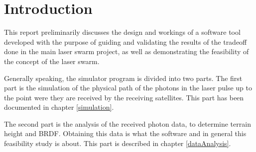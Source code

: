 \chapter{Introduction}
\label{intro}
This report preliminarily discusses the design and workings of a software tool developed with the purpose of guiding and validating the results of the tradeoff done in the main laser swarm project, as well as demonstrating the feasibility of the concept of the laser swarm.

Generally speaking, the simulator program is divided into two parts. The first part is the simulation of the physical path of the photons in the laser pulse up to the point were they are received by the receiving satellites. This part has been documented in chapter \ref{simulation}.

The second part is the analysis of the received photon data, to determine terrain height and \ac{BRDF}. Obtaining this data is what the software and in general this feasibility study is about. This part is described in chapter \ref{dataAnalysis}.


